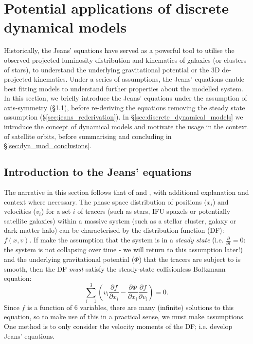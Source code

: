 \section{Potential applications of discrete dynamical models} \label{sec:jam}
Historically, the Jeans' equations have served as a powerful tool to utilise the observed projected luminosity distribution and kinematics of galaxies (or clusters of stars), to understand the underlying gravitational potential or the 3D de-projected kinematics. Under a series of assumptions, the Jeans' equations enable best fitting models to understand further properties about the modelled system. In this section, we briefly introduce the Jeans' equations under the assumption of axis-symmetry (\S\ref{sec:jeans_intro}), before re-deriving the equations removing the steady state assumption (\S\ref{sec:jeans_rederivation}). In \S\ref{sec:discrete_dynamical_models} we introduce the concept of dynamical models and motivate the usage in the context of satellite orbits, before summarising and concluding in \S\ref{sec:dyn_mod_conclusions}. 

\subsection{Introduction to the Jeans' equations} \label{sec:jeans_intro}
The narrative in this section follows that of \citet{cappellari2008} and \citet[BT henceforth;][]{binneytremaine}, with additional explanation and context where necessary. The phase space distribution of positions ($x_{i}$) and velocities ($v_{i}$) for a set $i$ of tracers (such as stars, IFU spaxels or potentially satellite galaxies) within a massive system (such as a stellar cluster, galaxy or dark matter halo) can be characterised by the distribution function (DF): $f(x,v)$. If make the assumption that the system is in a \textit{steady state} (i.e. $\frac{\partial}{\partial t} = 0$: the system is not collapsing over time - we will return to this assumption later!) and the underlying gravitational potential ($\Phi$) that the tracers are subject to is smooth, then the DF \textit{must} satisfy the steady-state collisionless Boltzmann equation:
\begin{equation}
\sum^{3}_{i=1}\left(v_{i}\frac{\partial f}{\partial x_i} - \frac{\partial \Phi}{\partial x_{i}}\frac{\partial f}{\partial v_{i}} \right) = 0.
\end{equation}
Since $f$ is a function of 6 variables, there are many (infinite) solutions to this equation, so to make use of this in a practical sense, we must make assumptions. One method is to only consider the velocity moments of the DF; i.e. develop Jeans' equations. 

